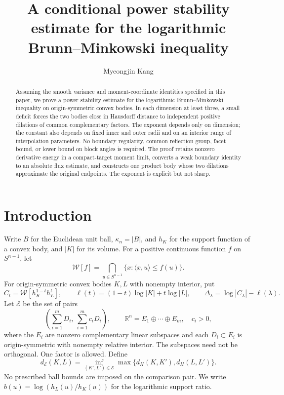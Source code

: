 \documentclass[11pt,reqno]{amsart}
\title[Logarithmic Brunn--Minkowski stability]{A conditional power stability estimate for the logarithmic Brunn--Minkowski inequality}
\author{Myeongjin Kang}
\date{}
\numberwithin{equation}{section}
\theoremstyle{remark}
\newcommand{\R}{\mathbb R}
\theoremstyle{definition}
\begin{document}
\begin{abstract}
Assuming the smooth variance and moment-coordinate identities specified
in this paper, we prove a power stability estimate for the logarithmic
Brunn--Minkowski inequality on origin-symmetric convex bodies. In each
dimension at least three, a small deficit forces the two bodies close
in Hausdorff distance to independent positive dilations of common
complementary factors. The exponent depends only on dimension; the
constant also depends on fixed inner and outer radii and on an interior
range of interpolation parameters. No boundary regularity, common
reflection group, facet bound, or lower bound on block angles is
required. The proof retains nonzero derivative energy in a compact-target
moment limit, converts a weak boundary identity to an absolute flux
estimate, and constructs one product body whose two dilations approximate
the original endpoints. The exponent is explicit but not sharp.
\end{abstract}
\maketitle

\section{Introduction}
Write $B$ for the Euclidean unit ball, $\kappa_n=|B|$, and $h_K$ for the support function of
a convex body, and $|K|$ for its volume. For a positive continuous function
$f$ on $S^{n-1}$, let
\[
 \mathcal W[f]=\bigcap_{u\in S^{n-1}}\{x:\langle x,u\rangle\le f(u)\}.
\]
For origin-symmetric convex bodies $K,L$ with nonempty interior, put
\[
 C_t=\mathcal W[h_K^{1-t}h_L^t],\qquad
 \ell(t)=(1-t)\log|K|+t\log|L|,\qquad
 \Delta_\lambda=\log|C_\lambda|-\ell(\lambda).
\]
Let $\mathcal E$ be the set of pairs
\begin{equation}\label{eq:equality}
 \left(\sum_{i=1}^m D_i,\ \sum_{i=1}^m c_iD_i\right),\qquad
 \R^n=E_1\oplus\cdots\oplus E_m,\quad c_i>0,
\end{equation}
where the $E_i$ are nonzero complementary linear subspaces and each
$D_i\subset E_i$ is origin-symmetric with nonempty relative interior.
The subspaces need not be orthogonal. One factor is allowed. Define
\[
 d_{\mathcal E}(K,L)=\inf_{(K',L')\in\mathcal E}
                  \max\{d_H(K,K'),d_H(L,L')\}.
\]
No prescribed ball bounds are imposed on the comparison pair. We write
$b(u)=\log(h_L(u)/h_K(u))$ for the logarithmic support ratio.
\end{document}
